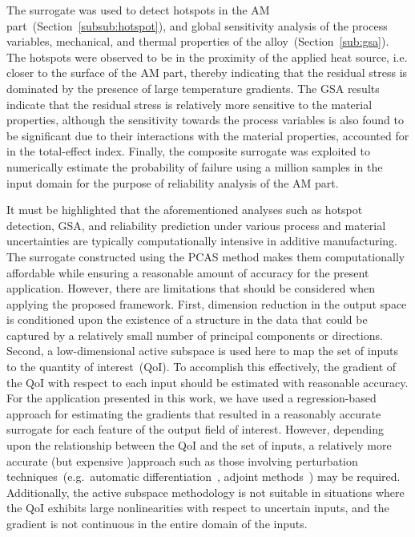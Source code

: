 The surrogate was used to detect hotspots in the AM part~(Section~\ref{subsub:hotspot}), and global sensitivity
analysis of the process variables, mechanical, and thermal properties of the alloy~(Section~\ref{sub:gsa}). 
The hotspots were observed to be in the proximity of the applied heat source, i.e. closer to the surface of the
AM part, thereby indicating that the residual stress is dominated by the presence of large temperature gradients.
The GSA results 
indicate that the residual stress is relatively more sensitive to the material properties, although the sensitivity
towards the process variables is also found to be significant due to their interactions with the material properties,
accounted for in the total-effect index. Finally, the composite surrogate was exploited to numerically estimate the
probability of failure using a million samples in the input domain for the purpose of reliability analysis of the AM part. 

It must be highlighted that the aforementioned
analyses such as hotspot detection, GSA, and reliability prediction under various process and material uncertainties
 are typically computationally intensive in additive manufacturing.
 The surrogate constructed using the PCAS method makes them computationally
affordable while ensuring a reasonable amount of accuracy for the present application.
 However, there are limitations that should be considered
when applying the proposed framework. First, dimension reduction in the output space is conditioned upon the
existence of a structure in the data that could be captured by a relatively small number of principal components or
directions. Second, a low-dimensional active subspace is used here to map the set of inputs to the quantity of
 interest~(QoI).
To accomplish this effectively, the gradient of the QoI with respect to each input should be estimated
with reasonable accuracy. For the application presented in this work, we have used a regression-based approach for 
estimating the gradients that resulted in a reasonably accurate surrogate for each feature of the output field of interest.
However, depending upon the relationship between the QoI and the set of inputs, a relatively more accurate
(but expensive )approach
such as those involving perturbation techniques~(e.g.~automatic differentiation~\cite{Kiparissides:2009}, adjoint 
methods~\cite{Borzi:2011, Alexanderian:2017}) may be required. Additionally, the active subspace methodology is
not suitable in situations where the QoI exhibits large nonlinearities with respect to uncertain inputs, and the
gradient is not continuous in the entire domain of the inputs.

